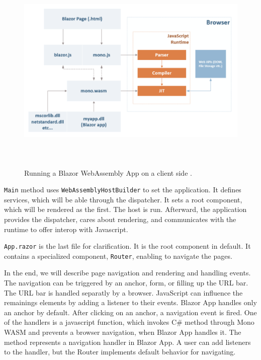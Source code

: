\begin{figure}\centering
\includegraphics[width=140mm, height=100mm]{./img/BlazorExecution}
\caption{Running a Blazor WebAssembly App on a client side .}
\label{img08:wasm}
\end{figure}
\par
\texttt{Main} method uses \texttt{WebAssemblyHostBuilder} to set the application.
It defines services, which will be able through the dispatcher.
It sets a root component, which will be rendered as the first.
The host is run.
Afterward, the application provides the dispatcher, cares about rendering, and communicates with the runtime to offer interop with Javascript.
\par
\texttt{App.razor} is the last file for clarification.
It is the root component in default.
It contains a specialized component, \texttt{Router}, enabling to navigate the pages.
\par
In the end, we will describe page navigation  and rendering and handling events.
The navigation  can be triggered by an anchor, form, or filling up the URL bar.
The URL bar is handled separatly by a browser.
JavaScript can influence the remainings elements by adding a listener to their events.
Blazor App handles only an anchor by default.
After clicking on an anchor, a navigation event is fired.
One of the handlers is a javascript function, which invokes C\# method through Mono WASM and prevents a browser navigation, when Blazor App handles it. 
The method represents a navigation handler in Blazor App.
A user can add listeners to the handler, but the Router implements default behavior for navigating.
